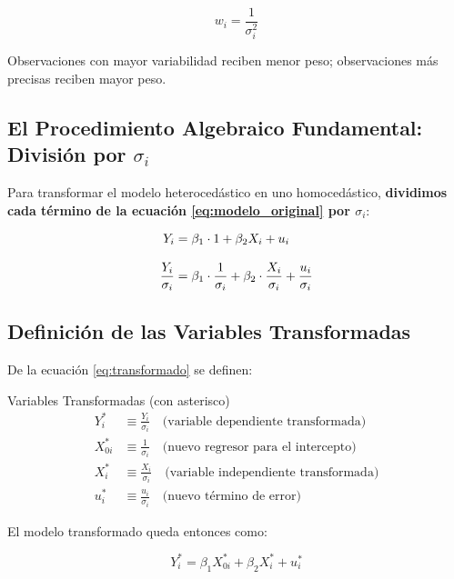 \documentclass[12pt,a4paper]{article}
\begin{document}
\begin{equation}
\boxed{w_i = \frac{1}{\sigma_i^2}}
\end{equation}

Observaciones con mayor variabilidad reciben menor peso; observaciones más precisas reciben mayor peso.

\subsection{El Procedimiento Algebraico Fundamental: División por $\sigma_i$}

Para transformar el modelo heterocedástico en uno homocedástico, \textbf{dividimos cada término de la ecuación \eqref{eq:modelo_original} por $\sigma_i$}:

\begin{align}
Y_i &= \beta_1 \cdot 1 + \beta_2 X_i + u_i \notag \\[8pt]
\frac{Y_i}{\sigma_i} &= \beta_1 \cdot \frac{1}{\sigma_i} + \beta_2 \cdot \frac{X_i}{\sigma_i} + \frac{u_i}{\sigma_i}
\label{eq:transformado}
\end{align}

\subsection{Definición de las Variables Transformadas}

De la ecuación \eqref{eq:transformado} se definen:

\begin{definicion}{Variables Transformadas (con asterisco)}
\begin{align}
Y_i^* &\equiv \frac{Y_i}{\sigma_i} \quad \text{(variable dependiente transformada)} \\[6pt]
X_{0i}^* &\equiv \frac{1}{\sigma_i} \quad \text{(nuevo regresor para el intercepto)} \\[6pt]
X_i^* &\equiv \frac{X_i}{\sigma_i} \quad \text{(variable independiente transformada)} \\[6pt]
u_i^* &\equiv \frac{u_i}{\sigma_i} \quad \text{(nuevo término de error)}
\end{align}
\end{definicion}

El modelo transformado queda entonces como:

\begin{equation}
\boxed{Y_i^* = \beta_1 X_{0i}^* + \beta_2 X_i^* + u_i^*}
\label{eq:modelo_transformado}
\end{equation}
\end{document}
